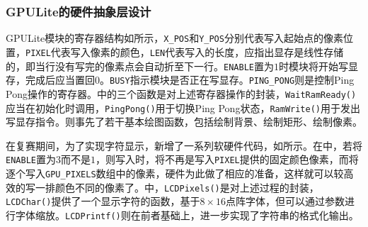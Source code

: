 \subsubsection{GPULite的硬件抽象层设计}

GPULite模块的寄存器结构如所示，\texttt{X\_POS}和\texttt{Y\_POS}分别代表写入起始点的像素位置，\texttt{PIXEL}代表写入像素的颜色，\texttt{LEN}代表写入的长度，应指出显存是线性存储的，即当行没有写完的像素点会自动折至下一行。\texttt{ENABLE}置为$1$时模块将开始写显存，完成后应当置回$0$。\texttt{BUSY}指示模块是否正在写显存。\texttt{PING\_PONG}则是控制Ping Pong操作的寄存器。中的三个函数是对上述寄存器操作的封装，\texttt{WaitRamReady()}应当在初始化时调用，\texttt{PingPong()}用于切换Ping Pong状态，\texttt{RamWrite()}用于发出写显存指令。则事先了若干基本绘图函数，包括绘制背景、绘制矩形、绘制像素。






在复赛期间，为了实现字符显示，新增了一系列软硬件代码，如所示。在中，若将\texttt{ENABLE}置为$3$而不是$1$，则写入时，将不再是写入\texttt{PIXEL}提供的固定颜色像素，而将逐个写入\texttt{GPU\_PIXELS}数组中的像素，硬件为此做了相应的准备，这样就可以较高效的写一排颜色不同的像素了。中，\texttt{LCDPixels()}是对上述过程的封装，\texttt{LCDChar()}提供了一个显示字符的函数，基于$8\times 16$点阵字体，但可以通过参数进行字体缩放。\texttt{LCDPrintf()}则在前者基础上，进一步实现了字符串的格式化输出。



